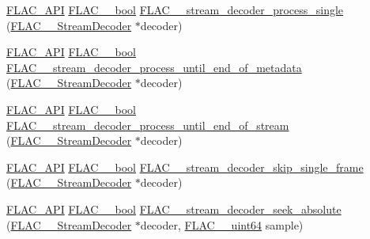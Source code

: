 \begin{DoxyCompactItemize}
\hyperlink{group__flac__export_ga56ca07df8a23310707732b1c0007d6f5}{F\+L\+A\+C\+\_\+\+A\+PI} \hyperlink{ordinals_8h_a95103469f1cbd78b8cf250194985b34e}{F\+L\+A\+C\+\_\+\+\_\+bool} \hyperlink{group__flac__stream__decoder_ga8c4708eb2c5d99595f64dc2473aa2f42}{F\+L\+A\+C\+\_\+\+\_\+stream\+\_\+decoder\+\_\+process\+\_\+single} (\hyperlink{struct_f_l_a_c_____stream_decoder}{F\+L\+A\+C\+\_\+\+\_\+\+Stream\+Decoder} $\ast$decoder)
\item 
\hyperlink{group__flac__export_ga56ca07df8a23310707732b1c0007d6f5}{F\+L\+A\+C\+\_\+\+A\+PI} \hyperlink{ordinals_8h_a95103469f1cbd78b8cf250194985b34e}{F\+L\+A\+C\+\_\+\+\_\+bool} \hyperlink{group__flac__stream__decoder_ga5e07ca9bf67dabf2521737f63b2156e2}{F\+L\+A\+C\+\_\+\+\_\+stream\+\_\+decoder\+\_\+process\+\_\+until\+\_\+end\+\_\+of\+\_\+metadata} (\hyperlink{struct_f_l_a_c_____stream_decoder}{F\+L\+A\+C\+\_\+\+\_\+\+Stream\+Decoder} $\ast$decoder)
\item 
\hyperlink{group__flac__export_ga56ca07df8a23310707732b1c0007d6f5}{F\+L\+A\+C\+\_\+\+A\+PI} \hyperlink{ordinals_8h_a95103469f1cbd78b8cf250194985b34e}{F\+L\+A\+C\+\_\+\+\_\+bool} \hyperlink{group__flac__stream__decoder_ga4544352442870ea9f16f388a97d81dff}{F\+L\+A\+C\+\_\+\+\_\+stream\+\_\+decoder\+\_\+process\+\_\+until\+\_\+end\+\_\+of\+\_\+stream} (\hyperlink{struct_f_l_a_c_____stream_decoder}{F\+L\+A\+C\+\_\+\+\_\+\+Stream\+Decoder} $\ast$decoder)
\item 
\hyperlink{group__flac__export_ga56ca07df8a23310707732b1c0007d6f5}{F\+L\+A\+C\+\_\+\+A\+PI} \hyperlink{ordinals_8h_a95103469f1cbd78b8cf250194985b34e}{F\+L\+A\+C\+\_\+\+\_\+bool} \hyperlink{group__flac__stream__decoder_ga371bc2b4f5571e40c47f4db5a8a745f8}{F\+L\+A\+C\+\_\+\+\_\+stream\+\_\+decoder\+\_\+skip\+\_\+single\+\_\+frame} (\hyperlink{struct_f_l_a_c_____stream_decoder}{F\+L\+A\+C\+\_\+\+\_\+\+Stream\+Decoder} $\ast$decoder)
\item 
\hyperlink{group__flac__export_ga56ca07df8a23310707732b1c0007d6f5}{F\+L\+A\+C\+\_\+\+A\+PI} \hyperlink{ordinals_8h_a95103469f1cbd78b8cf250194985b34e}{F\+L\+A\+C\+\_\+\+\_\+bool} \hyperlink{group__flac__stream__decoder_ga5c1c70de72e6ed49db6d61a9131d9117}{F\+L\+A\+C\+\_\+\+\_\+stream\+\_\+decoder\+\_\+seek\+\_\+absolute} (\hyperlink{struct_f_l_a_c_____stream_decoder}{F\+L\+A\+C\+\_\+\+\_\+\+Stream\+Decoder} $\ast$decoder, \hyperlink{ordinals_8h_aa78c8c70a3eb8a58af7436f278acde8e}{F\+L\+A\+C\+\_\+\+\_\+uint64} sample)
\end{DoxyCompactItemize}
